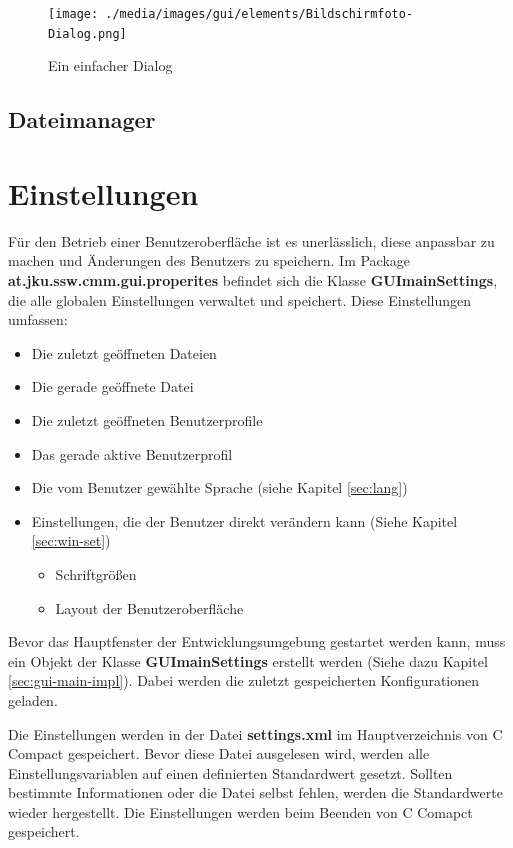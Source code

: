 \begin{figure}[htp]
\centering
\texttt{[image: ./media/images/gui/elements/Bildschirmfoto-Dialog.png]}
\caption{Ein einfacher Dialog}
\label{fig:win-dialog}
\end{figure}

\subsection{Dateimanager}


\section{Einstellungen}
\label{sec:guimainsettings}
Für den Betrieb einer Benutzeroberfläche ist es unerlässlich, diese anpassbar zu machen und Änderungen des Benutzers zu speichern. Im Package \textbf{at.jku.ssw.cmm.gui.properites} befindet sich die Klasse \textbf{GUImainSettings}, die alle globalen Einstellungen verwaltet und speichert. Diese Einstellungen umfassen:
\begin{itemize}
\item Die zuletzt geöffneten Dateien
\item Die gerade geöffnete Datei
\item Die zuletzt geöffneten Benutzerprofile
\item Das gerade aktive Benutzerprofil
\item Die vom Benutzer gewählte Sprache (siehe Kapitel \ref{sec:lang})
\item Einstellungen, die der Benutzer direkt verändern kann (Siehe Kapitel \ref{sec:win-set})
\begin{itemize}
\item Schriftgrößen
\item Layout der Benutzeroberfläche
\end{itemize}
\end{itemize}

Bevor das Hauptfenster der Entwicklungsumgebung gestartet werden kann, muss ein Objekt der Klasse \textbf{GUImainSettings} erstellt werden (Siehe dazu Kapitel \ref{sec:gui-main-impl}). Dabei werden die zuletzt gespeicherten Konfigurationen geladen.

Die Einstellungen werden in der Datei \textbf{settings.xml} im Hauptverzeichnis von C Compact gespeichert. Bevor diese Datei ausgelesen wird, werden alle Einstellungsvariablen auf einen definierten Standardwert gesetzt. Sollten bestimmte Informationen oder die Datei selbst fehlen, werden die Standardwerte wieder hergestellt. Die Einstellungen werden beim Beenden von C Comapct gespeichert.

